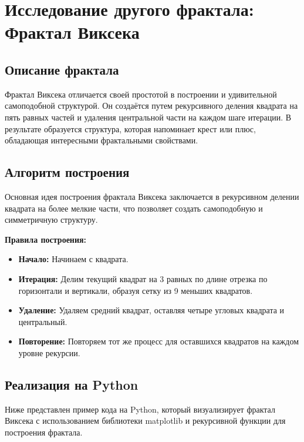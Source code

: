 \documentclass{article}
\begin{document}
	\newpage
	
	\section{Исследование другого фрактала: Фрактал Виксека}
	
	\subsection{Описание фрактала}
	Фрактал Виксека отличается своей простотой в построении и удивительной самоподобной структурой. Он создаётся путем рекурсивного деления квадрата на пять равных частей и удаления центральной части на каждом шаге итерации. В результате образуется структура, которая напоминает крест или плюс, обладающая интересными фрактальными свойствами.
	
	\subsection{Алгоритм построения}
	Основная идея построения фрактала Виксека заключается в рекурсивном делении квадрата на более мелкие части, что позволяет создать самоподобную и симметричную структуру.
	
	\textbf{Правила построения:}
	
	\begin{itemize}
		\item \textbf{Начало:} Начинаем с квадрата.
		\item \textbf{Итерация:} Делим текущий квадрат на 3 равных по длине отрезка по горизонтали и вертикали, образуя сетку из 9 меньших квадратов.
		\item \textbf{Удаление:} Удаляем средний квадрат, оставляя четыре угловых квадрата и центральный.
		\item \textbf{Повторение:} Повторяем тот же процесс для оставшихся квадратов на каждом уровне рекурсии.
	\end{itemize}
	
	\subsection{Реализация на Python}
	Ниже представлен пример кода на Python, который визуализирует фрактал Виксека с использованием библиотеки matplotlib и рекурсивной функции для построения фрактала.
	
\end{document}
